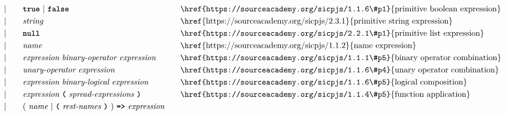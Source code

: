 \documentclass[a4paper]{article}
\begin{document}
\begin{alignat*}{9}
&&                       && |   &\quad && \textbf{\texttt{true}}\ |\ \textbf{\texttt{false}}
                                                           && \textrm{\href{https://sourceacademy.org/sicpjs/1.1.6\#p1}{primitive boolean expression}}\\
&&                       && |   &\quad &&  \textit{string}   && \textrm{\href{https://sourceacademy.org/sicpjs/2.3.1}{primitive string expression}} \\
&&                       && |   &\quad && \textbf{\texttt{null}}
                                                           && \textrm{\href{https://sourceacademy.org/sicpjs/2.2.1\#p1}{primitive list expression}} \\
&&                       && |   &\quad &&  \textit{name}   && \textrm{\href{https://sourceacademy.org/sicpjs/1.1.2}{name expression}} \\
&&                       && |   &\quad &&  \textit{expression} \  \textit{binary-operator} \ 
                                            \textit{expression} \qquad
                                                           && \textrm{\href{https://sourceacademy.org/sicpjs/1.1.1\#p5}{binary operator combination}} \\
&&                       && |   &\quad &&   \textit{unary-operator} \ 
                                            \textit{expression}
                                                           && \textrm{\href{https://sourceacademy.org/sicpjs/1.1.6\#p4}{unary operator combination}}\\
&&                       && |   &\quad &&  \textit{expression} \  \textit{binary-logical} \ 
                                            \textit{expression} \qquad
                                                           && \textrm{\href{https://sourceacademy.org/sicpjs/1.1.6\#p5}{logical composition}}\\
&&                       && |   &\quad &&   \textit{expression} \ 
                                            \textbf{\texttt{(}}\ \textit{spread-expressions}\
                                            \textbf{\texttt{)}}
                                                           && \textrm{\href{https://sourceacademy.org/sicpjs/1.1.4\#p5}{function application}} \\
&&                       && |   &\quad &&   (\ \textit{name}\ | \
                                               \textbf{\texttt{(}}\ \textit{rest-names}\ \textbf{\texttt{)}}\
                                            )\    
                                            \texttt{\textbf{=>}}\ \textit{expression}

\end{alignat*}
\end{document}
